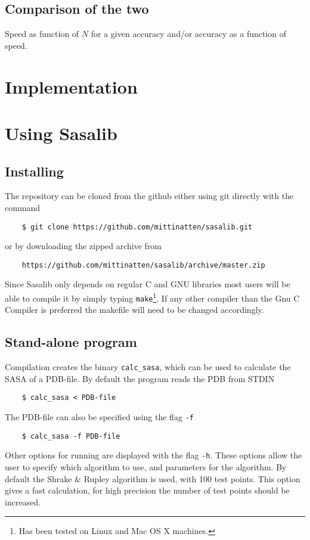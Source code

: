 \documentclass[a4paper,11pt]{article}
\begin{document}
\subsection{Comparison of the two}

Speed as function of $N$ for a given accuracy and/or accuracy as a
function of speed.

\section{Implementation}

\section{Using Sasalib}

\subsection{Installing}

The repository can be cloned from the github either using git
directly with the command
\begin{verbatim}
    $ git clone https://github.com/mittinatten/sasalib.git
\end{verbatim}
or by downloading the zipped archive from
\begin{verbatim}
    https://github.com/mittinatten/sasalib/archive/master.zip
\end{verbatim}
Since Sasalib only depends on regular C and GNU libraries most users
will be able to compile it by simply typing \texttt{make}\footnote{Has
  been tested on Linux and Mac OS X machines.}. If any other compiler
than the Gnu C Compiler is preferred the makefile will need to be
changed accordingly.

\subsection{Stand-alone program}

Compilation creates the binary \texttt{calc\_sasa}, which can be used
to calculate the SASA of a PDB-file. By default the program reads the
PDB from STDIN
\begin{verbatim} 
    $ calc_sasa < PDB-file    
\end{verbatim}
The PDB-file can also be specified using the flag \texttt{-f}
\begin{verbatim}
    $ calc_sasa -f PDB-file
\end{verbatim}
Other options for running are displayed with the flag
\texttt{-h}. These options allow the user to specify which algorithm
to use, and parameters for the algorithm. By default the Shrake \&
Rupley algorithm is used, with 100 test points. This option gives a
fast calculation, for high precision the number of test points should
be increased. 
\end{document}
